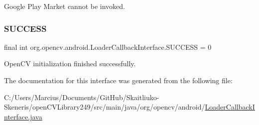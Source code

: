 Google Play Market cannot be invoked. \mbox{\label{interfaceorg_1_1opencv_1_1android_1_1_loader_callback_interface_a78294b158a76d2305db417b99260ac79}} 
\subsubsection{\texorpdfstring{S\+U\+C\+C\+E\+SS}{SUCCESS}}
{\footnotesize\ttfamily final int org.\+opencv.\+android.\+Loader\+Callback\+Interface.\+S\+U\+C\+C\+E\+SS = 0\hspace{0.3cm}{\ttfamily [static]}}

Open\+CV initialization finished successfully. 

The documentation for this interface was generated from the following file\+:\begin{DoxyCompactItemize}
\item 
C\+:/\+Users/\+Marcius/\+Documents/\+Git\+Hub/\+Skaitliuko-\/\+Skeneris/open\+C\+V\+Library249/src/main/java/org/opencv/android/\mbox{\hyperlink{_loader_callback_interface_8java}{Loader\+Callback\+Interface.\+java}}\end{DoxyCompactItemize}
